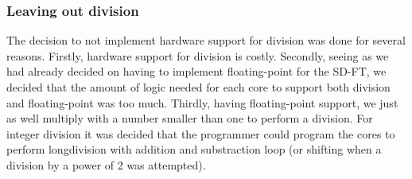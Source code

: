 \FloatBarrier
\subsubsection{Leaving out division}\label{subsubsection:fpga-alu-div}

The decision to not implement hardware support for division was done for several
reasons. Firstly, hardware support for division is costly. Secondly, seeing as
we had already decided on having to implement floating-point for the SD-FT, we
decided that the amount of logic needed for each core to support both division
and floating-point was too much. Thirdly, having floating-point support, we
just as well multiply with a number smaller than one to perform a division. For
integer division it was decided that the programmer could program the cores to
perform longdivision with addition and substraction loop (or shifting when a
division by a power of 2 was attempted).
